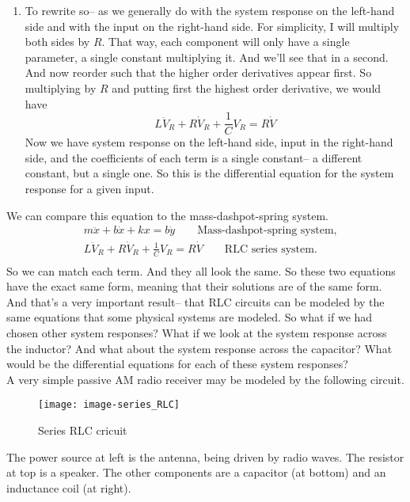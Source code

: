 \begin{enumerate}[label=Step.\arabic*]
  \item To rewrite so-- as we generally
  do with the system response on the left-hand side
  and with the input on the right-hand side.
  For simplicity, I will multiply both sides by $R$.
  That way, each component will only have a single parameter,
  a single constant multiplying it.
  And we'll see that in a second.
  And now reorder such that the higher order derivatives
  appear first.
  So multiplying by $R$ and putting first the highest order
  derivative, we would have
  \begin{equation*}
    L \ddot V _R + R \dot V _R + \frac{1}{C} V _R = R \dot V
  \end{equation*}
  Now we have system response on the left-hand side, input
  in the right-hand side, and the coefficients of each term
  is a single constant-- a different constant, but a single one.
  So this is the differential equation for the system
  response for a given input.
\end{enumerate}

We can compare this equation to the mass-dashpot-spring system.
\begin{align*}
  &m \ddot x + b \dot x + k x = b \dot y \qquad \text{Mass-dashpot-spring system,} \\
  &L \ddot V _R + R \dot V _R + \frac{1}{C} V _R = R \dot V
    \qquad \text{RLC series system.} \\
\end{align*}
So we can match each term.
And they all look the same.
So these two equations have the exact same form,
meaning that their solutions are of the same form.
And that's a very important result--
that RLC circuits can be modeled by the same equations
that some physical systems are modeled.
So what if we had chosen other system responses?
What if we look at the system response across the inductor?
And what about the system response across the capacitor?
What would be the differential equations for each of these system responses? \\

A very simple passive AM radio receiver may be modeled by the following circuit.

\begin{figure}[ht!]
  \centering
  \texttt{[image: image-series\_RLC]}
  \caption{Series RLC cricuit}
\end{figure}

The power source at left is the antenna, being driven by radio waves.
The resistor at top is a speaker.
The other components are a capacitor (at bottom) and an inductance coil (at right). \\

